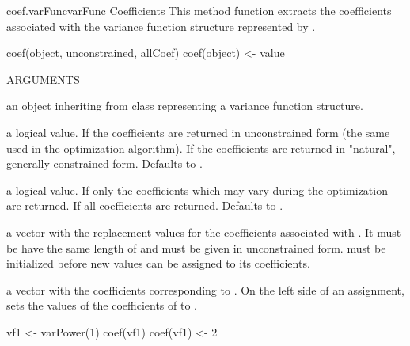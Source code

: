 \documentclass[pdftex]{article} \usepackage{url,graphicx}
\begin{document}
\begin{Helpfile}{coef.varFunc}{varFunc Coefficients}
This method function extracts the coefficients associated with the
variance function structure represented by .
\begin{Example}
coef(object, unconstrained, allCoef)
coef(object) <- value
\end{Example}
\begin{Argument}{ARGUMENTS}
\item[\Co{object:}]
an object inheriting from class 
representing a variance function structure.
\item[\Co{unconstrained:}]
a logical value. If  the coefficients
are returned in unconstrained form (the same used in the optimization
algorithm). If  the coefficients are returned in
"natural", generally constrained form. Defaults to .
\item[\Co{allCoef:}]
a logical value. If  only the coefficients
which may vary during the optimization are returned. If 
all coefficients are returned. Defaults to .
\item[\Co{value:}]
a vector with the replacement values for the coefficients
associated with . It must be have the same length of
 and must be given in unconstrained
form.  must be initialized before new values can be
assigned to its coefficients.
\end{Argument}
a vector with the coefficients corresponding to .
On the left side of an assignment, sets the values of the coefficients
of  to .
\need 15pt
\vspace{-16pt} 
\begin{Example}
vf1 <- varPower(1)
coef(vf1)
coef(vf1) <- 2
\end{Example}
\end{Helpfile}
\end{document}
